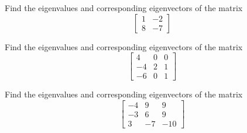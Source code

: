 \documentclass{ximera}
\begin{document}
\begin{exercise}%
    Find the eigenvalues and corresponding eigenvectors of the matrix 
    \[ 
        \begin{bmatrix} 1 & -2 \\ 8 & -7 \end{bmatrix} 
    \]
\end{exercise}

\begin{exercise}%
    Find the eigenvalues and corresponding eigenvectors of the matrix 
    \[ \begin{bmatrix} 4 & 0 & 0 \\ -4 & 2 & 1 \\ -6 & 0 & 1 \end{bmatrix} \]
\end{exercise}

\begin{exercise}%
    Find the eigenvalues and corresponding eigenvectors of the matrix 
    \[ \begin{bmatrix} -4 & 9 & 9 \\ -3 & 6 & 9 \\ 3 & -7 & -10 \end{bmatrix} \]
\end{exercise}
\end{document}
